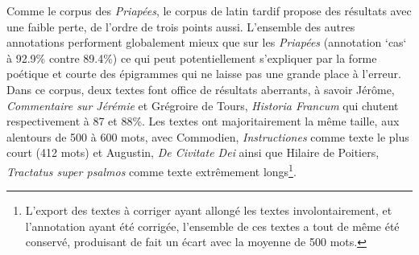 Comme le corpus des \textit{Priapées}, le corpus de latin tardif propose des résultats avec une faible perte, de l'ordre de trois points aussi. L'ensemble des autres annotations performent globalement mieux que sur les \textit{Priapées} (annotation `cas` à 92.9\% contre 89.4\%) ce qui peut potentiellement s'expliquer par la forme poétique et courte des épigrammes qui ne laisse pas une grande place à l'erreur. Dans ce corpus, deux textes font office de résultats aberrants, à savoir Jérôme, \textit{Commentaire sur Jérémie} et Grégroire de Tours, \textit{Historia Francum} qui chutent respectivement à 87 et 88\%. Les textes ont majoritairement la même taille, aux alentours de 500 à 600 mots, avec Commodien, \textit{Instructiones} comme texte le plus court (412 mots) et Augustin, \textit{De Civitate Dei} ainsi que Hilaire de Poitiers, \textit{Tractatus super psalmos} comme texte extrêmement longs\footnote{L'export des textes à corriger ayant allongé les textes involontairement, et l'annotation ayant été corrigée, l'ensemble de ces textes a tout de même été conservé, produisant de fait un écart avec la moyenne de 500 mots.}.

